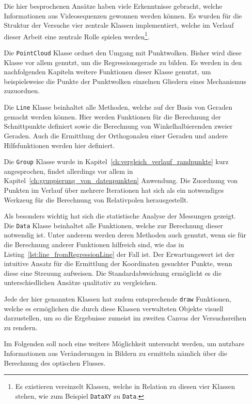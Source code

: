 Die hier besprochenen Ansätze haben viele Erkenntnisse gebracht, welche Informationen aus Videosequenzen gewonnen werden können.
Es wurden für die Struktur der Versuche vier zentrale Klassen implementiert, welche im Verlauf dieser Arbeit eine zentrale Rolle spielen werden\footnote{Es existieren vereinzelt Klassen, welche in Relation zu diesen vier Klassen stehen, wie zum Beispiel \lstinline{DataXY} zu \lstinline{Data}.}.

Die \lstinline{PointCloud} Klasse ordnet den Umgang mit Punktwolken.
Bisher wird diese Klasse vor allem genutzt, um die Regressionsgerade zu bilden. Es werden in den nachfolgenden Kapiteln weitere Funktionen dieser Klasse genutzt, um beispielsweise die Punkte der Punktwolken einzelnen Gliedern eines Mechanismus zuzuordnen.

Die \lstinline{Line} Klasse beinhaltet alle Methoden, welche auf der Basis von Geraden gemacht werden können.
Hier werden Funktionen für die Berechnung der Schnittpunkte definiert sowie die Berechnung von Winkelhalbierenden zweier Geraden.
Auch die Ermittlung der Orthogonalen einer Geraden und andere Hilfsfunktionen werden hier definiert.

Die \lstinline{Group} Klasse wurde in Kapitel~\ref{ch:vergleich_verlauf_randpunkte} kurz angesprochen, findet allerdings vor allem in Kapitel~\ref{ch:gruppierung_von_datenpunkten} Anwendung.
Die Zuordnung von Punkten im Verlauf über mehrere Iterationen hat sich als ein notwendiges Werkzeug für die Berechnung von Relativpolen herausgestellt.

Als besonders wichtig hat sich die statistische Analyse der Messungen gezeigt.
Die \lstinline{Data} Klasse beinhaltet alle Funktionen, welche zur Berechnung dieser notwendig ist.
Unter anderem werden deren Methoden auch genutzt, wenn sie für die Berechnung anderer Funktionen hilfreich sind, wie das in Listing~\ref{lst:line_fromRegressionLine} der Fall ist.
Der Erwartungswert ist der intuitive Ansatz für die Ermittlung der Koordinaten gesuchter Punkte, wenn diese eine Streuung aufweisen.
Die Standardabweichung ermöglicht es die unterschiedlichen Ansätze qualitativ zu vergleichen.

Jede der hier genannten Klassen hat zudem entsprechende \lstinline{draw} Funktionen, welche es ermöglichen die durch diese Klassen verwalteten Objekte visuell darzustellen, um so die Ergebnisse zumeist im zweiten Canvas der Versuchsreihen zu rendern.

Im Folgenden soll noch eine weitere Möglichkeit untersucht werden, um nutzbare Informationen aus Veränderungen in Bildern zu ermitteln nämlich über die Berechnung des optischen Flusses.

